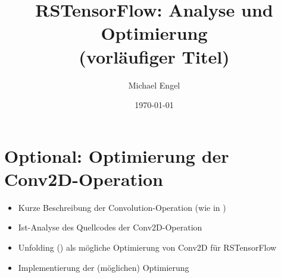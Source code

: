 \documentclass{IEEEtran}
\title{RSTensorFlow: Analyse und Optimierung\\(vorläufiger Titel)}
\author{Michael Engel}
\date{\today}
\begin{document}
\maketitle








\section{Optional: Optimierung der Conv2D-Operation}
\label{sec:conv2d}
\begin{itemize}
	\item{Kurze Beschreibung der Convolution-Operation (wie in \cite{stanford-CS231n})}
	\item{Ist-Analyse des Quellcodes der Conv2D-Operation}
	\item{Unfolding (\cite{conv2d-optimizing-unfolding}) als mögliche Optimierung von Conv2D für RSTensorFlow}
	\item{Implementierung der (möglichen) Optimierung}
\end{itemize}



{}
\end{document}
